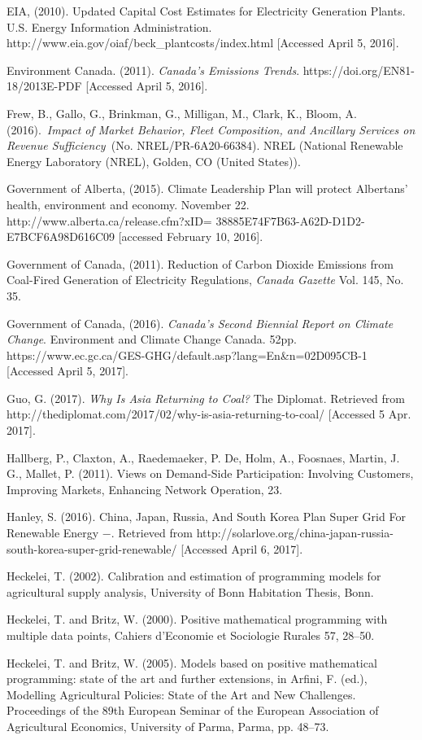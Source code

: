 EIA, (2010). Updated Capital Cost Estimates for Electricity Generation
Plants. U.S. Energy Information Administration.
http://www.eia.gov/oiaf/beck\_plantcosts/index.html {[}Accessed April 5,
2016{]}.

Environment Canada. (2011). \emph{Canada's Emissions Trends}.
https://doi.org/EN81-18/2013E-PDF {[}Accessed April 5, 2016{]}.

Frew, B., Gallo, G., Brinkman, G., Milligan, M., Clark, K., Bloom, A.
(2016).~\emph{Impact of Market Behavior, Fleet Composition, and
Ancillary Services on Revenue Sufficiency~}(No. NREL/PR-6A20-66384).
NREL (National Renewable Energy Laboratory (NREL), Golden, CO (United
States)).

Government of Alberta, (2015). Climate Leadership Plan will protect
Albertans' health, environment and economy. November 22.
http://www.alberta.ca/release.cfm?xID=
38885E74F7B63-A62D-D1D2-E7BCF6A98D616C09 {[}accessed February 10,
2016{]}.

Government of Canada, (2011). Reduction of Carbon Dioxide Emissions from
Coal-Fired Generation of Electricity Regulations, \emph{Canada Gazette}
Vol. 145, No. 35.

Government of Canada, (2016). \emph{Canada's Second Biennial Report on
Climate Change}. Environment and Climate Change Canada. 52pp.
https://www.ec.gc.ca/GES-GHG/default.asp?lang=En\&n=02D095CB-1
{[}Accessed April 5, 2017{]}.

Guo, G. (2017). \emph{Why Is Asia Returning to Coal?} The Diplomat.
Retrieved from
http://thediplomat.com/2017/02/why-is-asia-returning-to-coal/
{[}Accessed 5 Apr. 2017{]}.

Hallberg, P., Claxton, A., Raedemaeker, P. De, Holm, A., Foosnaes,
Martin, J. G., Mallet, P. (2011). Views on Demand-Side Participation:
Involving Customers, Improving Markets, Enhancing Network Operation, 23.

Hanley, S. (2016). China, Japan, Russia, And South Korea Plan Super Grid
For Renewable Energy −. Retrieved from
http://solarlove.org/china-japan-russia-south-korea-super-grid-renewable/
{[}Accessed April 6, 2017{]}.

Heckelei, T. (2002). Calibration and estimation of programming models
for agricultural supply analysis, University of Bonn Habitation Thesis,
Bonn.

Heckelei, T. and Britz, W. (2000). Positive mathematical programming
with multiple data points, Cahiers d'Economie et Sociologie Rurales 57,
28--50.

Heckelei, T. and Britz, W. (2005). Models based on positive mathematical
programming: state of the art and further extensions, in Arfini, F.
(ed.), Modelling Agricultural Policies: State of the Art and New
Challenges. Proceedings of the 89th European Seminar of the European
Association of Agricultural Economics, University of Parma, Parma, pp.
48--73.

